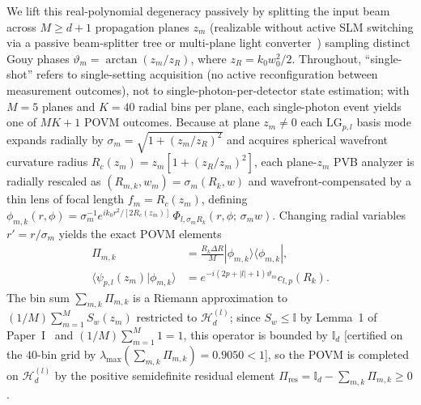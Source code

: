 \documentclass[aps,pra,onecolumn,notitlepage,11pt,tightenlines,nofootinbib,floatfix,longbibliography]{revtex4-2}
\newcommand{\braket}[2]{\langle #1 | #2 \rangle}
\newcommand{\ket}[1]{| #1 \rangle}
\newcommand{\bra}[1]{\langle #1 |}
\newcommand{\abs}[1]{\lvert #1 \rvert}
\begin{document}
We lift this real-polynomial degeneracy passively by splitting the input beam across $M \ge d+1$ propagation planes $z_m$ (realizable without active SLM switching via a passive beam-splitter tree or multi-plane light converter~\cite{Fontaine2019,Bouchard2018}) sampling distinct Gouy phases $\vartheta_m = \arctan(z_m/z_R)$, where $z_R = k_0 w_0^2/2$. Throughout, ``single-shot'' refers to single-setting acquisition (no active reconfiguration between measurement outcomes), not to single-photon-per-detector state estimation; with $M = 5$ planes and $K = 40$ radial bins per plane, each single-photon event yields one of $MK + 1$ POVM outcomes. Because at plane $z_m \neq 0$ each $\mathrm{LG}_{p,l}$ basis mode expands radially by $\sigma_m = \sqrt{1 + (z_m/z_R)^2}$ and acquires spherical wavefront curvature radius $R_c(z_m) = z_m[1 + (z_R/z_m)^2]$, each plane-$z_m$ PVB analyzer is radially rescaled as $(R_{m,k}, w_m) = \sigma_m(R_k, w)$ and wavefront-compensated by a thin lens of focal length $f_m = R_c(z_m)$, defining $\phi_{m,k}(r,\phi) = \sigma_m^{-1} e^{ik_0 r^2/[2R_c(z_m)]}\,\Phi_{l,\sigma_m R_k}(r,\phi;\,\sigma_m w)$. Changing radial variables $r' = r/\sigma_m$ yields the exact POVM elements~\cite{Renes2004}
\begin{align}
\Pi_{m,k} &= \frac{R_k \Delta R}{M}\ket{\phi_{m,k}}\bra{\phi_{m,k}}, \nonumber \\
\braket{\psi_{p,l}(z_m)}{\phi_{m,k}} &= e^{-i(2p+\abs{l}+1)\vartheta_m} c_{l,p}(R_k).
\label{eq:ic_povm_elements}
\end{align}
The bin sum $\sum_{m,k}\Pi_{m,k}$ is a Riemann approximation to $(1/M)\sum_{m=1}^M S_w(z_m)$ restricted to $\mathcal{H}_d^{(l)}$; since $S_w \le \mathbb{I}$ by Lemma~1 of Paper~I~\cite{AyalaPaperI} and $(1/M)\sum_{m=1}^M 1 = 1$, this operator is bounded by $\mathbb{I}_d$ [certified on the $40$-bin grid by $\lambda_{\max}(\sum_{m,k}\Pi_{m,k}) = 0.9050 < 1$], so the POVM is completed on $\mathcal{H}_d^{(l)}$ by the positive semidefinite residual element $\Pi_{\mathrm{res}} = \mathbb{I}_d - \sum_{m,k}\Pi_{m,k} \ge 0$.
\end{document}

